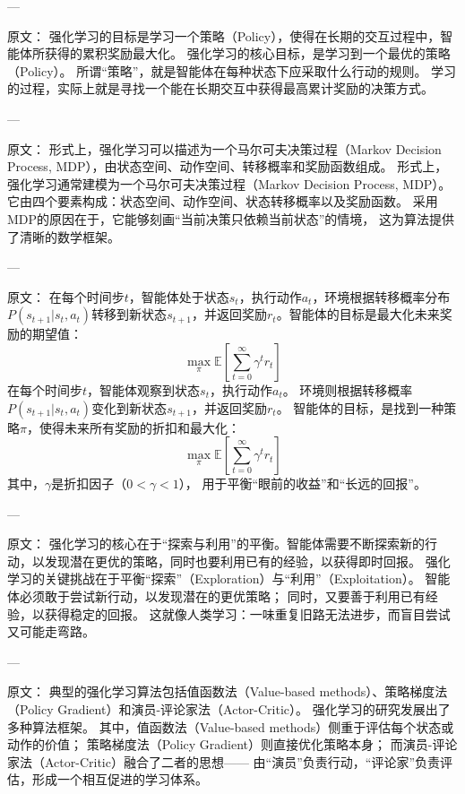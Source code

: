 ---

原文：
强化学习的目标是学习一个策略（Policy），使得在长期的交互过程中，智能体所获得的累积奖励最大化。
强化学习的核心目标，是学习到一个最优的策略（Policy）。  
所谓“策略”，就是智能体在每种状态下应采取什么行动的规则。  
学习的过程，实际上就是寻找一个能在长期交互中获得最高累计奖励的决策方式。

---

原文：
形式上，强化学习可以描述为一个马尔可夫决策过程（Markov Decision Process, MDP），由状态空间、动作空间、转移概率和奖励函数组成。
形式上，强化学习通常建模为一个马尔可夫决策过程（Markov Decision Process, MDP）。  
它由四个要素构成：状态空间、动作空间、状态转移概率以及奖励函数。  
采用MDP的原因在于，它能够刻画“当前决策只依赖当前状态”的情境，  
这为算法提供了清晰的数学框架。

---

原文：
在每个时间步$t$，智能体处于状态$s_t$，执行动作$a_t$，环境根据转移概率分布$P(s_{t+1}|s_t, a_t)$转移到新状态$s_{t+1}$，并返回奖励$r_t$。智能体的目标是最大化未来奖励的期望值：
$$
\max_\pi \mathbb{E}\left[\sum_{t=0}^\infty \gamma^t r_t\right]
$$
在每个时间步$t$，智能体观察到状态$s_t$，执行动作$a_t$。  
环境则根据转移概率$P(s_{t+1}|s_t, a_t)$变化到新状态$s_{t+1}$，并返回奖励$r_t$。  
智能体的目标，是找到一种策略$\pi$，使得未来所有奖励的折扣和最大化：
$$
\max_\pi \mathbb{E}\left[\sum_{t=0}^\infty \gamma^t r_t\right]
$$  
其中，$\gamma$是折扣因子（$0 < \gamma < 1$），  
用于平衡“眼前的收益”和“长远的回报”。

---

原文：
强化学习的核心在于“探索与利用”的平衡。智能体需要不断探索新的行动，以发现潜在更优的策略，同时也要利用已有的经验，以获得即时回报。
强化学习的关键挑战在于平衡“探索”（Exploration）与“利用”（Exploitation）。  
智能体必须敢于尝试新行动，以发现潜在的更优策略；  
同时，又要善于利用已有经验，以获得稳定的回报。  
这就像人类学习：一味重复旧路无法进步，而盲目尝试又可能走弯路。

---

原文：
典型的强化学习算法包括值函数法（Value-based methods）、策略梯度法（Policy Gradient）和演员-评论家法（Actor-Critic）。
强化学习的研究发展出了多种算法框架。  
其中，值函数法（Value-based methods）侧重于评估每个状态或动作的价值；  
策略梯度法（Policy Gradient）则直接优化策略本身；  
而演员-评论家法（Actor-Critic）融合了二者的思想——  
由“演员”负责行动，“评论家”负责评估，形成一个相互促进的学习体系。

